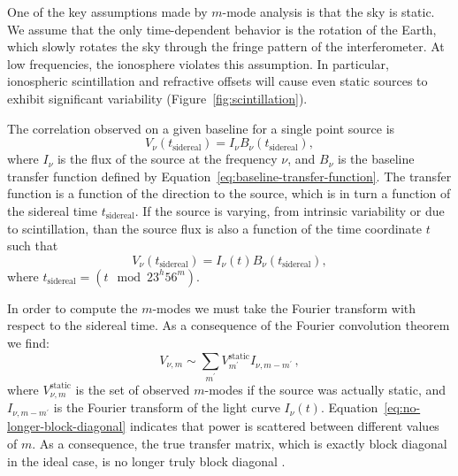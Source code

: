 \documentclass[twocolumn]{aastex61}
\begin{document}
One of the key assumptions made by $m$-mode analysis is that the sky is static.  We assume that the
only time-dependent behavior is the rotation of the Earth, which slowly rotates the sky through the
fringe pattern of the interferometer. At low frequencies, the ionosphere violates this assumption.
In particular, ionospheric scintillation and refractive offsets will cause even static sources to
exhibit significant variability (Figure~\ref{fig:scintillation}).

The correlation observed on a given baseline for a single point source is
\begin{equation}
    V_\nu(t_{\textrm{sidereal}}) = I_\nu B_\nu(t_{\textrm{sidereal}}),
\end{equation}
where $I_\nu$ is the flux of the source at the frequency $\nu$, and $B_\nu$ is the baseline transfer
function defined by Equation~\ref{eq:baseline-transfer-function}. The transfer function is a
function of the direction to the source, which is in turn a function of the sidereal time
$t_{\textrm{sidereal}}$. If the source is varying, from intrinsic variability or due to
scintillation, than the source flux is also a function of the time coordinate $t$ such that
\begin{equation}
    V_\nu(t_{\textrm{sidereal}}) = I_\nu(t) B_\nu(t_{\textrm{sidereal}}),
\end{equation}
where $t_{\textrm{sidereal}} = (t \mod 23^h56^m)$.

In order to compute the $m$-modes we must take the Fourier transform with respect to the sidereal
time. As a consequence of the Fourier convolution theorem we find:
\begin{equation}\label{eq:no-longer-block-diagonal}
    V_{\nu, m} \sim \sum_{m^\prime} V_{m^\prime}^\textrm{static} I_{\nu, m-m^\prime}\,,
\end{equation}
where $V_{\nu, m}^{\textrm{static}}$ is the set of observed $m$-modes if the source was actually
static, and $I_{\nu, m-m^\prime}$ is the Fourier transform of the light curve $I_{\nu}(t)$.
Equation~\ref{eq:no-longer-block-diagonal} indicates that power is scattered between different
values of $m$. As a consequence, the true transfer matrix, which is exactly block diagonal in the
ideal case, is no longer truly block diagonal \citep{richard_ionosphere_thoughts}.
\end{document}
